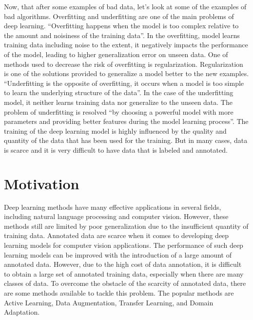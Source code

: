 Now, that after some examples of bad data, let's look at some of the examples of bad algorithms. Overfitting and underfitting are one of the main problems of deep learning. ``Overfitting happens when the model is too complex relative to the amount and noisiness of the training data''\cite{10.5555/3153997}. In the overfitting, model learns training data including noise to the extent, it negatively impacts the performance of the model, leading to higher generalization error on unseen data. One of methods used to decrease the risk of overfitting is regularization\cite{kukacka2017regularization}. Regularization is one of the solutions provided to generalize a model better to the new examples. ``Underfitting is the opposite of overfitting, it occurs when a model is too simple to learn the underlying structure of the data''\cite{10.5555/3153997}. In the case of the underfitting model, it neither learns training data nor generalize to the unseen data. The problem of underfitting is resolved ``by choosing a powerful model with more parameters and providing better features during the model learning process''\cite{10.5555/3153997}. The training of the deep learning model is highly influenced by the quality and quantity of the data that has been used for the training. But in many cases, data is scarce and it is very difficult to have data that is labeled and annotated.





\section{Motivation}\label{motivation}

Deep learning methods have many effective applications in several fields, including natural language processing and computer vision. However, these methods still are limited by poor generalization due to the insufficient quantity of training data\cite{8978087}. Annotated data are scarce when it comes to developing deep learning models for computer vision applications. The performance of such deep learning models can be improved with the introduction of a large amount of annotated data. However, due to the high cost of data annotation, it is difficult to obtain a large set of annotated training data, especially when there are many classes of data. To overcome the obstacle of the scarcity of annotated data, there are some methods available to tackle this problem. The popular methods are Active Learning\cite{hemmer2020deal}, Data Augmentation\cite{Shorten.2019}, Transfer Learning\cite{zhuang2020comprehensive}, and Domain Adaptation\cite{redko2020survey}. 

